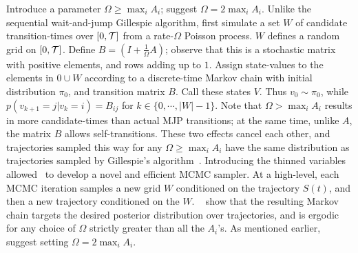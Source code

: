 Introduce a parameter $\Omega \ge \max_i A_i$;
\cite{RaoTeh13} suggest $\Omega = 2 \max_i A_i$. 
Unlike the sequential wait-and-jump Gillespie algorithm, first simulate 
a set $W$ of candidate
transition-times over $[0,{\mathcal T}]$ from a rate-$\Omega$ 
Poisson process. $W$ %
defines a random grid on $[0,{\mathcal T}]$.
Define $B = \left(I +\frac{1}{\Omega}A\right)$; observe that this is a
stochastic matrix with positive elements, and rows adding up to $1$.
Assign state-values to the elements in $0 \cup W$ according to a discrete-time 
Markov chain with initial distribution $\pi_0$, and transition matrix $B$.
Call these states $V$. Thus $v_0 \sim \pi_0$, while $p(v_{k+1}=j|v_k=i) = B_{ij}$
for $k \in \{0,\cdots,|W|-1\}$.
Note that $\Omega > \max_i A_i$ results in more
candidate-times than actual MJP transitions; at the same time, unlike $A$, 
the matrix $B$ allows self-transitions. These two effects cancel
each other, and trajectories sampled this way for any $\Omega \ge \max_i A_i$
have the same distribution as trajectories
sampled by Gillespie's algorithm~\cite{Jen1953,RaoTeh13}.
Introducing the thinned variables allowed~\cite{RaoTeh13} to develop
a novel and efficient MCMC sampler. At a 
high-level, each MCMC iteration 
samples a new grid $W$ conditioned on the trajectory $S(t)$, 
and then a new trajectory conditioned on the $W$. 
    ~\cite{RaoTeh13} show that the resulting Markov chain targets
    the desired posterior distribution over trajectories, and is 
    ergodic for any choice of $\Omega$ strictly greater than all the
    $A_i$'s. As mentioned earlier, \cite{RaoTeh13} suggest setting $\Omega = 2\max_i A_i$.
